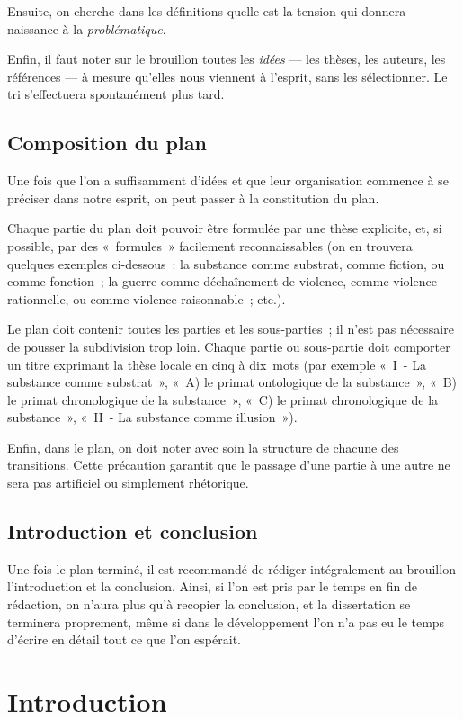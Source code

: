 \documentclass[a4paper]{article}
\begin{document}
Ensuite, on cherche dans les définitions quelle est la tension qui
donnera naissance à la \emph{problématique}.

Enfin, il faut noter sur le brouillon toutes les \emph{idées} --- les thèses,
les auteurs, les références --- à mesure qu'elles nous viennent à
l'esprit, sans les sélectionner. Le tri s'effectuera spontanément plus
tard.
\subsection{Composition du plan}
\label{sec-1-3}


Une fois que l'on a suffisamment d'idées et que leur organisation
commence à se préciser dans notre esprit, on peut passer à la
constitution du plan.

Chaque partie du plan doit pouvoir être formulée par une thèse
explicite, et, si possible, par des « formules » facilement
reconnaissables (on en trouvera quelques exemples ci-dessous : la
substance comme substrat, comme fiction, ou comme fonction ; la guerre
comme déchaînement de violence, comme violence rationnelle, ou comme
violence raisonnable ; etc.).

Le plan doit contenir toutes les parties et les sous-parties ; il n'est
pas nécessaire de pousser la subdivision trop loin. Chaque partie ou
sous-partie doit comporter un titre exprimant la thèse locale en cinq à
dix mots (par exemple « I - La substance comme substrat », « A) le primat
ontologique de la substance », « B) le primat chronologique de la
substance », « C) le primat chronologique de la substance », « II - La
substance comme illusion »).

Enfin, dans le plan, on doit noter avec soin la structure de chacune des
transitions. Cette précaution garantit que le passage d'une partie à une
autre ne sera pas artificiel ou simplement rhétorique.
\subsection{Introduction et conclusion}
\label{sec-1-4}


Une fois le plan terminé, il est recommandé de rédiger intégralement au
brouillon l'introduction et la conclusion. Ainsi, si l'on est pris par
le temps en fin de rédaction, on n'aura plus qu'à recopier la
conclusion, et la dissertation se terminera proprement, même si dans le
développement l'on n'a pas eu le temps d'écrire en détail tout ce que
l'on espérait.
\section{Introduction}
\label{sec-2}
\end{document}
